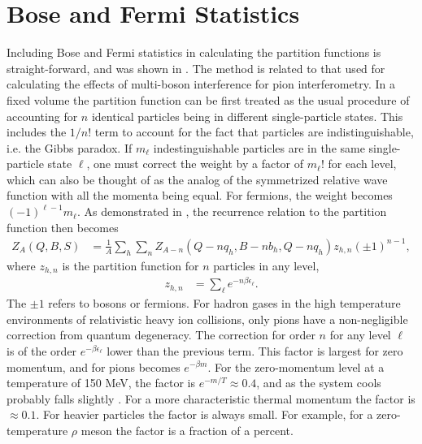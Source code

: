 
\section{Bose and Fermi Statistics}\label{sec:bose}

Including Bose and Fermi statistics in calculating the partition functions is straight-forward, and was shown in \cite{}. The method is related to that used for calculating the effects of multi-boson interference for pion interferometry. In a fixed volume the partition function can be first treated as the usual procedure of accounting for $n$ identical particles being in different single-particle states. This includes the $1/n!$ term to account for the fact that particles are indistinguishable, i.e. the Gibbs paradox. If $m_\ell$ indestinguishable particles are in the same single-particle state $\ell$, one must correct the weight by a factor of $m_\ell!$ for each level, which can also be thought of as the analog of the symmetrized relative wave function with all the momenta being equal. For fermions, the weight becomes $(-1)^{\ell-1}m_\ell$. As demonstrated in \cite{}, the recurrence relation to the partition function then becomes
\begin{eqnarray}\label{eq:Zbf}
Z_{A}(Q,B,S)&=\frac{1}{A}\sum_h \sum_n Z_{A-n}(Q-nq_h,B-nb_h,Q-nq_h)z_{h,n}(\pm 1)^{n-1},
\end{eqnarray}
where $z_{h,n}$ is the partition function for $n$ particles in any level, 
\begin{eqnarray}
z_{h,n}&=\sum_\ell e^{-n\beta \epsilon_\ell}.
\end{eqnarray}
The $\pm 1$ refers to bosons or fermions. For hadron gases in the high temperature environments of relativistic heavy ion collisions, only pions have a non-negligible correction from quantum degeneracy. The correction for order $n$ for any level $\ell$ is of the order $e^{-\beta \epsilon_\ell}$ lower than the previous term. This factor is largest for zero momentum, and for pions becomes $e^{-\beta m}$. For the zero-momentum level at a temperature of 150 MeV, the factor is $e^{-m/T}\approx 0.4$, and as the system cools probably falls slightly \cite{gong}. For a more characteristic thermal momentum the factor is $\approx 0.1$. For heavier particles the factor is always small. For example, for a zero-temperature $\rho$ meson the factor is a fraction of a percent.

